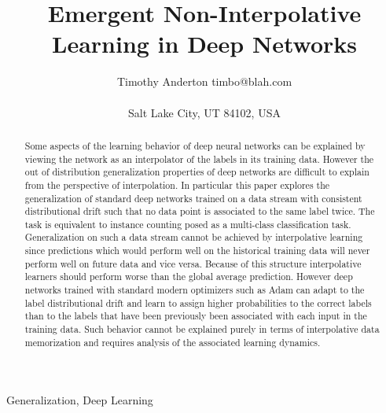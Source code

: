 \documentclass[twoside,11pt]{article}
\begin{document}
\title{Emergent Non-Interpolative Learning in Deep Networks}

\author{\name Timothy Anderton \email timbo@blah.com \\
       \addr \\
       Salt Lake City, UT 84102, USA
}


\maketitle

\begin{abstract}%
  Some aspects of the learning behavior of deep neural networks can be explained by viewing the network as an interpolator of the labels in its training data. However the out of distribution generalization properties of deep networks are difficult to explain from the perspective of interpolation. In particular this paper explores the generalization of standard deep networks trained on a data stream with consistent distributional drift such that no data point is associated to the same label twice. The task is equivalent to instance counting posed as a multi-class classification task. Generalization on such a data stream cannot be achieved by interpolative learning since predictions which would perform well on the historical training data will never perform well on future data and vice versa. Because of this structure interpolative learners should perform worse than the global average prediction. However deep networks trained with standard modern optimizers such as Adam can adapt to the label distributional drift and learn to assign higher probabilities to the correct labels than to the labels that have been previously been associated with each input in the training data. 
  Such behavior cannot be explained purely in terms of interpolative data memorization and requires analysis of the associated learning dynamics.  
\end{abstract}

\begin{keywords}
  Generalization, Deep Learning
\end{keywords}
\end{document}
